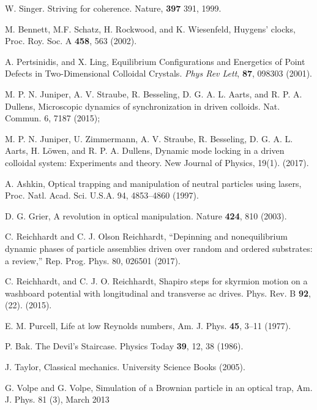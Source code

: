 \documentclass[twocolumn,preprintnumbers,amsmath,amssymb,aps,prx]{revtex4}
\begin{document}
\begin{thebibliography}{99}
   W. Singer. Striving for coherence. Nature, {\bf 397} 391, 1999.

     M. Bennett, M.F. Schatz, H. Rockwood, and K. Wiesenfeld, Huygens' clocks, Proc. Roy. Soc. A {\bf 458}, 563 (2002).


     A. Pertsinidis, and X. Ling,  Equilibrium Configurations and Energetics of Point Defects in Two-Dimensional Colloidal Crystals. {\it Phys Rev Lett}, {\bf 87}, 098303 (2001). %

     M. P. N. Juniper, A. V. Straube, R. Besseling, D. G. A. L. Aarts, and R. P. A. Dullens, Microscopic dynamics of synchronization in driven colloids. Nat. Commun. 6, 7187 (2015); 
      
     M. P. N. Juniper,  U. Zimmermann, A. V. Straube, R. Besseling, D. G. A. L. Aarts, H. L{\"o}wen, and R. P. A. Dullens,  Dynamic mode locking in a driven colloidal system: Experiments and theory. New Journal of Physics, 19(1). (2017).  %

     A. Ashkin, Optical trapping and manipulation of neutral particles using lasers, Proc. Natl. Acad. Sci. U.S.A. 94, 4853–4860 (1997).

     D. G. Grier, A revolution in optical manipulation. Nature {\bf 424}, 810 (2003).

     C. Reichhardt and C. J. Olson Reichhardt, “Depinning and nonequilibrium dynamic phases of particle assemblies driven over random and ordered substrates: a review,” Rep. Prog. Phys. 80, 026501 (2017).

     C. Reichhardt, and C. J. O. Reichhardt,  Shapiro steps for skyrmion motion on a washboard potential with longitudinal and transverse ac drives. Phys. Rev. B {\bf 92}, (22). (2015).      
      
     E. M. Purcell, Life at low Reynolds numbers, Am. J. Phys. {\bf 45}, 3–11 (1977).

    
     P. Bak. The Devil's Staircase. Physics Today {\bf 39}, 12, 38 (1986).

     J. Taylor,  Classical mechanics. University Science Books (2005).

     G. Volpe and G. Volpe, Simulation of a Brownian particle in an optical trap, Am. J. Phys. 81 (3), March 2013


\end{thebibliography}
\end{document}
